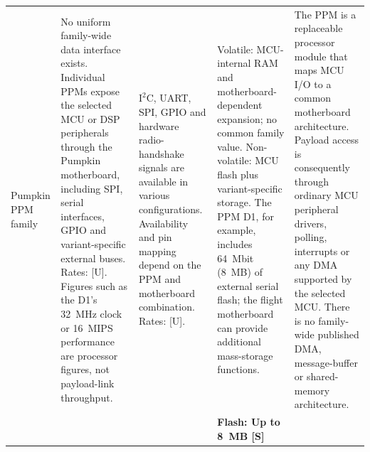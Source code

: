 \documentclass[10pt]{../datasheet}
\let\cite\citep
\begin{document}
\begin{landscape}
\begin{longtable}{|p{3.2cm}|p{4.5cm}|p{4.5cm}|p{4.5cm}|p{5.5cm}|}
    Pumpkin PPM family \cite{pumpkin_ppm_a3_ds}                        &
    No uniform family-wide data interface exists. Individual PPMs expose the
    selected MCU or DSP peripherals through the Pumpkin motherboard, including
    SPI, serial interfaces, GPIO and variant-specific external buses. Rates:
    [U]. Figures such as the D1's 32~MHz clock or 16~MIPS performance are
    processor figures, not payload-link throughput.
                                                                       & $\text{I}^2\text{C}$, UART, SPI, GPIO and hardware radio-handshake signals
    are available in various configurations. Availability and pin mapping depend
    on the PPM and motherboard combination. Rates: [U].
                                                                       & Volatile: MCU-internal RAM and motherboard-dependent expansion; no common
    family value. Non-volatile: MCU flash plus variant-specific storage. The PPM
    D1, for example, includes 64~Mbit (8~MB) of external serial flash; the
    flight motherboard can provide additional mass-storage functions.  & The PPM
    is a replaceable processor module that maps MCU I/O to a common motherboard
    architecture. Payload access is consequently through ordinary MCU peripheral
    drivers, polling, interrupts or any DMA supported by the selected MCU. There
    is no family-wide published DMA, message-buffer or shared-memory
    architecture.
    \\
    \cline{2-5}
                                                                       &                                                                            &                                                  & \textbf{Flash: Up to 8~MB [S]}            & \\ \hline\hline


\end{longtable}
\end{landscape}
\end{document}
